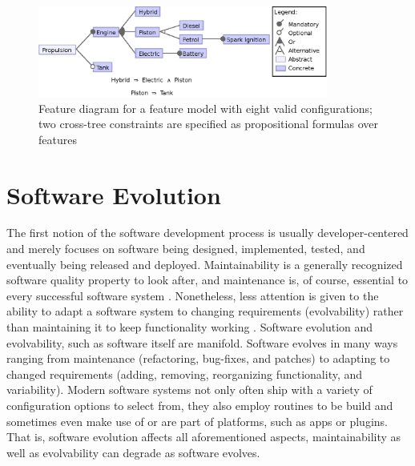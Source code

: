 \begin{figure}[htbp]
  \centering
  
  	\includegraphics[width=0.85\textwidth]{images/introduction_fm.eps}
  \caption{Feature diagram for a feature model with eight valid configurations;
  two cross-tree constraints are specified as propositional formulas over
  features}
  \label{fig:introduction_fm}
\end{figure}

\section{Software Evolution} \label{sec:evolving_solftware}
The first notion of the software development process is usually
developer-centered and merely focuses on software being designed, implemented,
tested, and eventually being released and deployed.
Maintainability is a generally recognized software quality
property to look after, and maintenance is, of course, essential to every
successful software system \cite{liggesmeyer_software-qualitat:_2009}. Nonetheless, less attention is given to
the ability to adapt a software system to changing requirements (evolvability) rather than maintaining it to keep functionality
working \citep{parnas_software_1994}. Software evolution and evolvability, such
as software itself are manifold. Software evolves in many ways ranging from
maintenance (refactoring, bug-fixes, and patches) to adapting to changed
requirements (adding, removing, reorganizing functionality, and variability).
Modern software systems not only often ship with a variety of configuration
options to select from, they also employ routines to be build and sometimes even
make use of or are part of platforms, such as apps or plugins. That is,
software evolution affects all aforementioned aspects, maintainability as
well as evolvability can degrade as software evolves.

